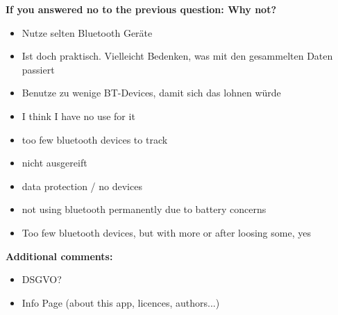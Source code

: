 \begin{flushleft}
\par


\textbf{If you answered no to the previous question: Why not?}
\begin{itemize}
	\item Nutze selten Bluetooth Geräte
	\item Ist doch praktisch. Vielleicht Bedenken, was mit den gesammelten Daten passiert
	\item Benutze zu wenige BT-Devices, damit sich das lohnen würde
	\item I think I have no use for it
	\item too few bluetooth devices to track
	\item nicht ausgereift
	\item data protection / no devices
	\item not using bluetooth permanently due to battery concerns
	\item Too few bluetooth devices, but with more or after loosing some, yes
	
\end{itemize}

\textbf{Additional comments:}
\begin{itemize}
	\item DSGVO?
	\item Info Page (about this app, licences, authors...)
\end{itemize}

\end{flushleft}

